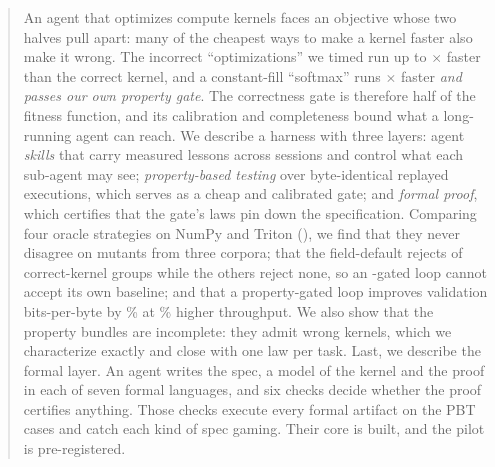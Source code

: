 \begin{abstract}
An agent that optimizes compute kernels faces an objective whose two halves pull
apart: many of the cheapest ways to make a kernel faster also make it wrong. The
incorrect ``optimizations'' we timed run up to \sabSpeedNoDivide$\times$ faster
than the correct kernel, and a constant-fill ``softmax'' runs \fillSpeedup$\times$
faster \emph{and passes our own property gate}. The correctness gate is therefore
half of the fitness function, and its calibration and completeness bound what a
long-running agent can reach. We describe a harness with three layers: agent
\emph{skills} that carry measured lessons across sessions and control what each
sub-agent may see; \emph{property-based testing} over byte-identical replayed
executions, which serves as a cheap and calibrated gate; and \emph{formal proof},
which certifies that the gate's laws pin down the specification. Comparing four oracle
strategies on NumPy and Triton (\gpuName), we find that they never disagree on
\mutantsAdmitted{} mutants from three corpora; that the field-default \allclose
rejects \fpAllcloseRate{} of correct-kernel groups while the others reject none,
so an \allclose-gated loop cannot accept its own baseline; and that a
property-gated loop improves validation bits-per-byte by \loopBpbGain\% at
\loopTputGain\% higher throughput. We also show that the property bundles are
incomplete: they admit \gapFamiliesTotal{} wrong kernels, which we characterize
exactly and close with one law per task. Last, we describe the formal layer. An
agent writes the spec, a model of the kernel and the proof in each of seven formal
languages, and six checks decide whether the proof certifies anything. Those checks
execute every formal artifact on the PBT cases and catch each kind of spec gaming.
Their core is built, and the pilot is pre-registered.
\end{abstract}

